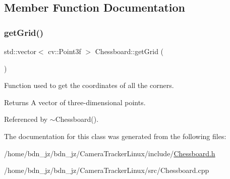 \subsection{Member Function Documentation}
\mbox{\label{classChessboard_af81a2c5b8a5914ef625a7accd0f2462f}} 
\subsubsection{\texorpdfstring{get\+Grid()}{getGrid()}}
{\footnotesize\ttfamily std\+::vector$<$ cv\+::\+Point3f $>$ Chessboard\+::get\+Grid (\begin{DoxyParamCaption}{ }\end{DoxyParamCaption})}



Function used to get the coordinates of all the corners. 

\begin{DoxyReturn}{Returns}
A vector of three-\/dimensional points. 
\end{DoxyReturn}


Referenced by $\sim$\+Chessboard().



The documentation for this class was generated from the following files\+:\begin{DoxyCompactItemize}
\item 
/home/bdn\+\_\+jz/bdn\+\_\+jz/\+Camera\+Tracker\+Linux/include/\hyperlink{Chessboard_8h}{Chessboard.\+h}\item 
/home/bdn\+\_\+jz/bdn\+\_\+jz/\+Camera\+Tracker\+Linux/src/Chessboard.\+cpp\end{DoxyCompactItemize}
